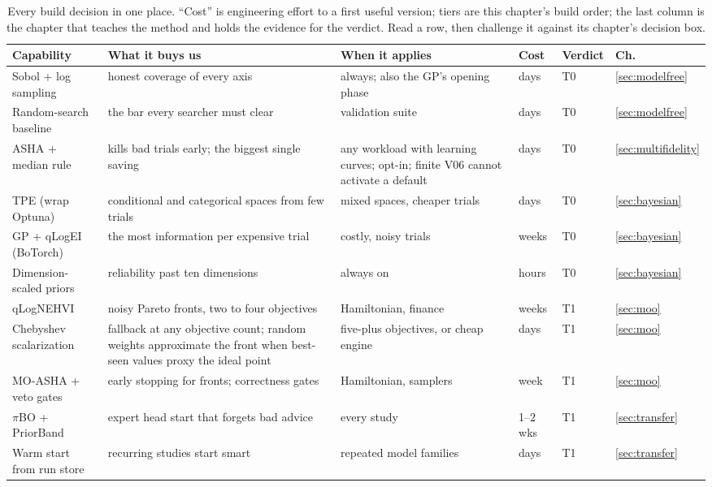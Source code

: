 \begin{table}[tp]
\centering
\small
\caption{Every build decision in one place. ``Cost'' is engineering
effort to a first useful version; tiers are this chapter's build order;
the last column is the chapter that teaches the method and holds the
evidence for the verdict. Read a row, then challenge it against its
chapter's decision box.}
\label{tab:decisions}
\begin{tabularx}{\textwidth}{@{}l>{\raggedright\arraybackslash}X>{\raggedright\arraybackslash}Xlll@{}}
\toprule
Capability & What it buys us & When it applies & Cost & Verdict & Ch. \\
\midrule
Sobol + log sampling & honest coverage of every axis & always; also the GP's opening phase & days & T0 & \ref{sec:modelfree} \\
Random-search baseline & the bar every searcher must clear & validation suite & days & T0 & \ref{sec:modelfree} \\
ASHA + median rule & kills bad trials early; the biggest single saving & any workload with learning curves; opt-in; finite V06 cannot activate a default & days & T0 & \ref{sec:multifidelity} \\
TPE (wrap Optuna) & conditional and categorical spaces from few trials & mixed spaces, cheaper trials & days & T0 & \ref{sec:bayesian} \\
GP + qLogEI (BoTorch) & the most information per expensive trial & costly, noisy trials & weeks & T0 & \ref{sec:bayesian} \\
Dimension-scaled priors & reliability past ten dimensions & always on & hours & T0 & \ref{sec:bayesian} \\
qLogNEHVI & noisy Pareto fronts, two to four objectives & Hamiltonian, finance & weeks & T1 & \ref{sec:moo} \\
Chebyshev scalarization & fallback at any objective count; random weights approximate the front when best-seen values proxy the ideal point & five-plus objectives, or cheap engine & days & T1 & \ref{sec:moo} \\
MO-ASHA + veto gates & early stopping for fronts; correctness gates & Hamiltonian, samplers & week & T1 & \ref{sec:moo} \\
$\pi$BO + PriorBand & expert head start that forgets bad advice & every study & 1--2 wks & T1 & \ref{sec:transfer} \\
Warm start from run store & recurring studies start smart & repeated model families & days & T1 & \ref{sec:transfer} \\

\end{tabularx}
\end{table}
